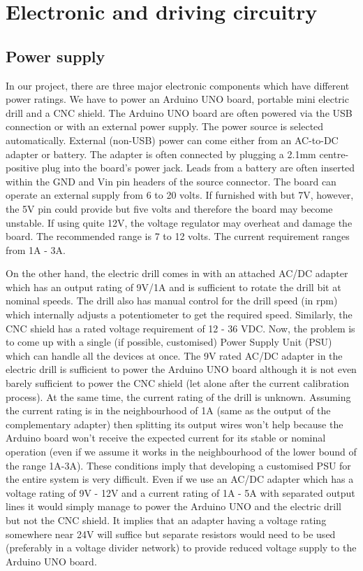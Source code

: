 \chapter{Electronic and driving circuitry} \label{chapter4}

\section{Power supply} \label{psupply}

In our project, there are three major electronic components which have different power ratings. We have to power an Arduino UNO board, portable mini electric drill and a CNC shield. The Arduino UNO board are often powered via the USB connection or with an external power supply. The power source is selected automatically. External (non-USB) power can come either from an AC-to-DC adapter or battery. The adapter is often connected by plugging a 2.1mm centre-positive plug into the board's power jack. Leads from a battery are often inserted within the GND and Vin pin headers of the source connector. The board can operate an external supply from 6 to 20 volts. If furnished with but  7V, however, the 5V pin could provide but five volts and therefore the board may become unstable. If using quite 12V, the voltage regulator may overheat and damage the board. The recommended range is 7 to 12 volts. The current requirement ranges from 1A - 3A. \par

On the other hand, the electric drill comes in with an attached AC/DC adapter which has an output rating of 9V/1A and is sufficient to rotate the drill bit at nominal speeds. The drill also has manual control for the drill speed (in rpm) which internally adjusts a potentiometer to get the required speed. Similarly, the CNC shield has a rated voltage requirement of 12 - 36 VDC. Now, the problem is to come up with a single (if possible, customised) Power Supply Unit (PSU) which can handle all the devices at once. The 9V rated AC/DC adapter in the electric drill is sufficient to power the Arduino UNO board although it is not even barely sufficient to power the CNC shield (let alone after the current calibration process). At the same time, the current rating of the drill is unknown. Assuming the current rating is in the neighbourhood of 1A (same as the output of the complementary adapter) then splitting its output wires won’t help because the Arduino board won’t receive the expected current for its stable or nominal operation (even if we assume it works in the neighbourhood of the lower bound of the range 1A-3A). These conditions imply that developing a customised PSU for the entire system is very difficult. Even if we use an AC/DC adapter which has a voltage rating of 9V - 12V and a current rating of 1A - 5A with separated output lines it would simply manage to power the Arduino UNO and the electric drill but not the CNC shield. It implies that an adapter having a voltage rating somewhere near 24V will suffice but separate resistors would need to be used (preferably in a voltage divider network) to provide reduced voltage supply to the Arduino UNO board. \par

